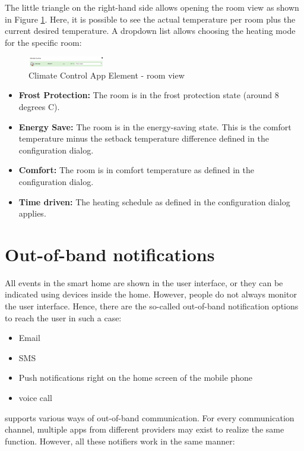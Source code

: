 The little triangle on the right-hand side allows opening the room view as shown in 
Figure \ref{app27d}. Here, it is possible to see the actual temperature per room plus the 
current desired temperature. A dropdown list allows choosing the heating mode for 
the specific room:

\begin{figure}
\begin{center}
\includegraphics[width=0.3\textwidth]{pngs/cap6/app27d.png}
\caption{Climate Control App Element - room view}
\label{app27d}
\end{center}
\end{figure}

\begin{itemize}
\item \textbf{Frost Protection:} The room is in the frost protection state (around 8 degrees C).
\item \textbf{Energy Save:} The room is in the energy-saving state. This is the comfort 
temperature minus the setback temperature difference defined in the configuration dialog.
\item \textbf{Comfort:} The room is in comfort temperature as defined in the configuration dialog.
\item \textbf{Time driven:} The heating schedule as defined in the configuration dialog applies.
\end {itemize}

\section{Out-of-band notifications}

All events in the smart home are shown in the user interface, or they can be indicated 
using devices inside the home. However, people do not always monitor the user interface. 
Hence, there are the so-called out-of-band notification options to reach the user in such a case:

\begin{itemize}
\item Email
\item SMS
\item Push notifications right on the home screen of the mobile phone
\item voice call
\end{itemize}

\zway supports various ways of out-of-band communication. For every communication channel, 
multiple apps from different providers may exist to realize the same function. However, 
all these notifiers work in the same manner:

